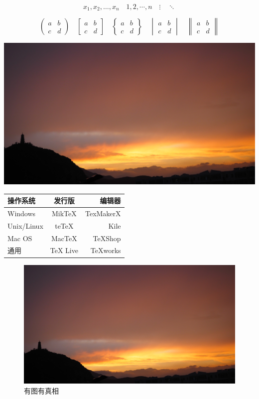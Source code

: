 \documentclass[UTF8]{ctexart}
\begin{document}
\[ x_1,x_2,\dots ,x_n\quad 1,2,\cdots ,n\quad
\vdots\quad \ddots \]

\[ \begin{pmatrix} a&b\\c&d \end{pmatrix} \quad
\begin{bmatrix} a&b\\c&d \end{bmatrix} \quad
\begin{Bmatrix} a&b\\c&d \end{Bmatrix} \quad
\begin{vmatrix} a&b\\c&d \end{vmatrix} \quad
\begin{Vmatrix} a&b\\c&d \end{Vmatrix} \]


\includegraphics[width = .5\textwidth]{autumn.jpg}

\begin{tabular}{|l|c|r|}
    \hline
操作系统& 发行版& 编辑器\\
    \hline
Windows & MikTeX & TexMakerX \\
    \hline
Unix/Linux & teTeX & Kile \\
    \hline
Mac OS & MacTeX & TeXShop \\
    \hline
通用& TeX Live & TeXworks \\
    \hline
\end{tabular}

\begin{figure}[htbp]
\centering
\includegraphics[width = .5\textwidth]{autumn.jpg}
\caption{有图有真相}
\label{fig:myphoto}
\end{figure}
\end{document}
